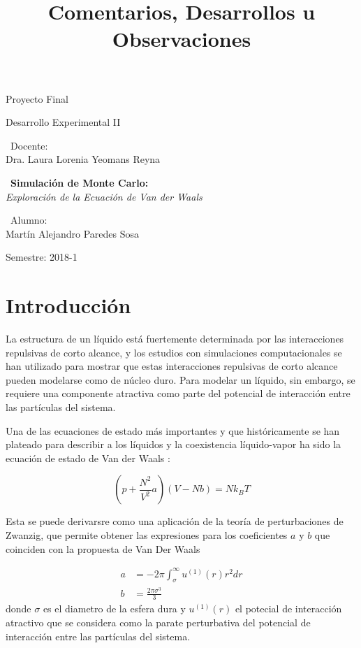 \documentclass[12pt,letterpaper]{article}
\title{ Comentarios, Desarrollos u Observaciones  }
\begin{document}
\begin{titlepage}
	\centering
    \vspace*{2cm}
	{\Large Proyecto Final \par}
	\vfill
	{\Large Desarrollo Experimental II \par}
	\vfill
	{\large\ Docente:\\ Dra. Laura Lorenia Yeomans Reyna \par}
    \vfill
    {\large\ \textbf{Simulación de Monte Carlo:}\\ 
    \emph{Exploración de la Ecuación de Van der Waals}\par}
    \vfill
    {\large\ Alumno:\\ Martín Alejandro Paredes Sosa \par}
	\vfill
	{\large Semestre: 2018-1\par}
\end{titlepage}

\section{Introducción}
	
	La estructura de un líquido está fuertemente determinada por las interacciones repulsivas de corto alcance, y  los estudios con simulaciones computacionales se han utilizado para mostrar que estas interacciones repulsivas de corto alcance pueden modelarse como de núcleo duro. Para modelar un líquido, sin embargo, se requiere una componente atractiva como parte del potencial de interacción entre las partículas del sistema.  

Una de las ecuaciones de estado más importantes y que históricamente se han plateado para describir a los líquidos y la coexistencia líquido-vapor ha sido la ecuación de estado de Van der Waals \cite{Modern}:

\begin{equation}
	\left( p + \frac{N^2}{V^2}a \right) \left( V -Nb \right) = Nk_B T
	\label{VanDerWaals}
\end{equation}

Esta se puede derivarsre como una aplicación de la teoría de perturbaciones de Zwanzig\cite{Stats}, que permite obtener las expresiones para los coeficientes $a$ y $b$ que coinciden con la propuesta de Van Der Waals \cite{Stats} 

\begin{align}
	a &= -2\pi \int_{\sigma}^{\infty} u^{(1)}(r)r^2dr \label{Coef_A_1} \\
	b &= \frac{2\pi\sigma^3}{3} \label{Coef_B_1}
\end{align}
donde $\sigma$ es el diametro de la esfera dura y $u^{(1)}(r)$ el potecial de interacción atractivo que se considera como la parate perturbativa del potencial de interacción entre las partículas del sistema. 
\end{document}
